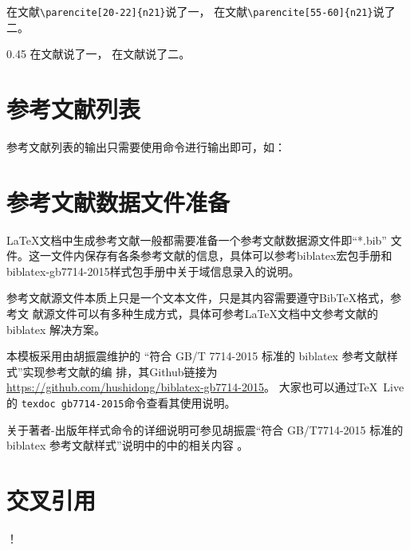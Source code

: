 \begin{center}
  \begin{minipage}{0.45\textwidth}
    \small
    在文献\verb|\parencite[20-22]{n21}|说了一， 在文献\verb|\parencite[55-60]{n21}|说了二。%
  \end{minipage}
  \begin{boxedminipage}{0.45\textwidth}
    \small
    在文献\parencite[20-22]{n21}说了一， 在文献\parencite[55-60]{n21}说了二。%
  \end{boxedminipage}
\end{center}


\section{参考文献列表}

参考文献列表的输出只需要使用命令进行输出即可，如：


\section{参考文献数据文件准备}

\LaTeX 文档中生成参考文献一般都需要准备一个参考文献数据源文件即\enquote{*.bib}
文件。这一文件内保存有各条参考文献的信息，具体可以参考biblatex宏包手册和
biblatex-gb7714-2015样式包手册\cite{胡振震2019}中关于域信息录入的说明。

参考文献源文件本质上只是一个文本文件，只是其内容需要遵守BibTeX格式，参考文
献源文件可以有多种生成方式，具体可参考\LaTeX{}文档中文参考文献的biblatex 
解决方案\parencite[2.2节]{胡振震2016}。

本模板采用由胡振震维护的
\enquote{符合 GB/T 7714-2015 标准的 biblatex 参考文献样式}实现参考文献的编
排\cite{胡振震2019}，其Github链接为
\url{https://github.com/hushidong/biblatex-gb7714-2015}。
大家也可以通过\TeX~Live的 \verb|texdoc gb7714-2015|命令查看其使用说明。

关于著者-出版年样式命令的详细说明可参见胡振震\enquote{符合 GB/T7714-2015 
标准的 biblatex 参考文献样式}说明中的中的相关内容
\parencite[2.2、2.3节]{胡振震2016}。

\section{交叉引用}
！


